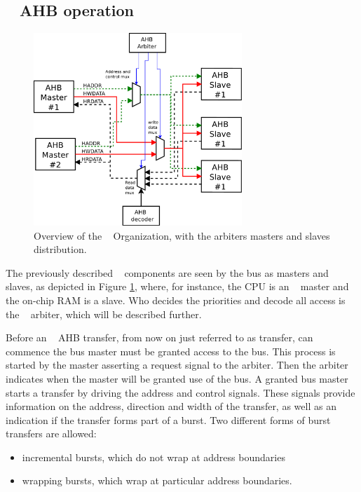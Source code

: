 
\subsection{\amba~ AHB operation}

\begin{figure}[!ht]
    \centering
    \includegraphics[width=0.7\textwidth]{figures/pdf/amba2_arbiter.pdf}
    \caption{Overview  of the \amba~ Organization, with the arbiters masters and slaves distribution.}
    \label{fig:internorg}
\end{figure}

The previously described \amba~ components are seen by the bus as masters and slaves, as depicted in Figure \ref{fig:internorg}, where, for instance, the CPU is an \amba~ master and the on-chip RAM is a slave. Who decides the priorities and decode all access is the \amba~ arbiter, which will be described further.

Before an \amba~ AHB transfer, from now on just referred to as transfer, can commence the bus master must be granted access to the bus. This process is started by the master asserting a request signal to the arbiter. Then the arbiter indicates when the master will be granted use of the bus. A granted bus master starts a transfer by driving the address and control signals. These signals provide information on the address, direction and width of the transfer, as well as an indication if the transfer forms part of a burst. Two different forms of burst transfers are allowed:
\begin{itemize}
\item incremental bursts, which do not wrap at address boundaries
\item wrapping bursts, which wrap at particular address boundaries.
\end{itemize}

